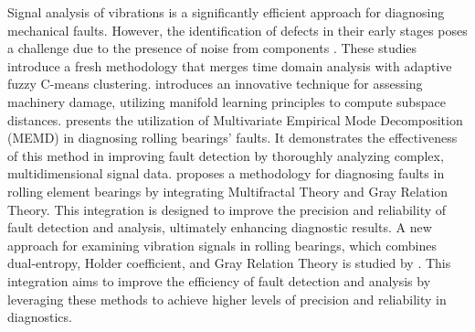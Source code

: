 \documentclass[sn-basic,pdflatex]{sn-jnl}
\theoremstyle{remark}
\theoremstyle{definition}
\begin{document}
Signal analysis of vibrations is a significantly efficient approach for
diagnosing mechanical faults. However, the identification of defects in
their early stages poses a challenge due to the presence of noise from
components \citep{WOS:000369301600001, WOS:000367992900001}. These
studies introduce a fresh methodology that merges time domain analysis
with adaptive fuzzy C-means clustering. \citet{WOS:000366765500038}
introduces an innovative technique for assessing machinery damage,
utilizing manifold learning principles to compute subspace distances.
\citet{WOS:000379556300014} presents the utilization of Multivariate
Empirical Mode Decomposition (MEMD) in diagnosing rolling bearings'
faults. It demonstrates the effectiveness of this method in improving
fault detection by thoroughly analyzing complex, multidimensional signal
data. \citet{WOS:000391229300006} proposes a methodology for diagnosing
faults in rolling element bearings by integrating Multifractal Theory
and Gray Relation Theory. This integration is designed to improve the
precision and reliability of fault detection and analysis, ultimately
enhancing diagnostic results. A new approach for examining vibration
signals in rolling bearings, which combines dual-entropy, Holder
coefficient, and Gray Relation Theory is studied by
\citet{WOS:000426819400027}. This integration aims to improve the
efficiency of fault detection and analysis by leveraging these methods
to achieve higher levels of precision and reliability in diagnostics.
\end{document}
